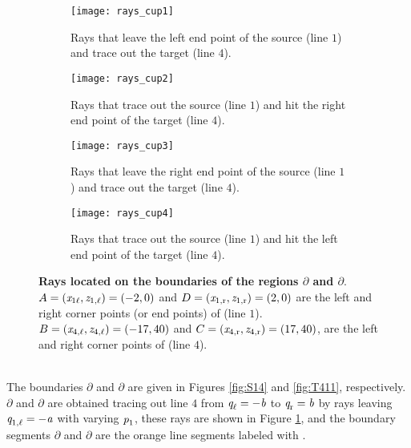 \begin{figure}
\centering
\begin{subfigure}{.48\textwidth}
  \centering
  \texttt{[image: rays\_cup1]}
  \caption{Rays that leave the left end point of the source (line $1$) and trace out the target (line $4$).}
  \label{fig:cup1}
\end{subfigure}%
\hfill
\begin{subfigure}{.48\textwidth}
  \centering
  \texttt{[image: rays\_cup2]}
  \caption{Rays that trace out the source (line $1$) and hit the right end point of the target (line $4$).}
  \label{fig:cup2}
\end{subfigure} %
\hfill
\begin{subfigure}{.48\textwidth}
  \centering
  \texttt{[image: rays\_cup3]}
  \caption{Rays that leave the right end point of the source (line $1$) and trace out the target (line $4$).}
  \label{fig:cup3}
\end{subfigure}%
\hfill
\begin{subfigure}{.48\textwidth}
  \centering
  \texttt{[image: rays\_cup4]}
  \caption{Rays that trace out the source (line $1$) and hit the left end point of the target (line $4$).}
  \label{fig:cup4}
\end{subfigure}
\caption{\textbf{Rays located on the boundaries of the regions $\partial$ and $\partial$}.
$A = (\textit{x}_{1 \ell}, \textit{z}_{1, \ell}) =(-2, 0)$ and 
$D = (\textit{x}_{1, \textrm{r}}, \textit{z}_{1, \textrm{r}}) = (2, 0)$ 
are the left and right corner points (or end points) of
 (line $1$).
$B =  (\textit{x}_{4, \ell}, \textit{z}_{4, \ell}) = (-17, 40)$ and $C =  (\textit{x}_{4, \textrm{r}}, \textit{z}_{4, \textrm{r}}) = (17 , 40)$, are the left and right corner points of  (line $4$).}
\label{fig:cups}
\end{figure} \\
 The boundaries $\partial$ and $\partial$ are given in Figures \ref{fig:S14} and \ref{fig:T411}, respectively.
$\partial$ and $\partial$ are obtained tracing out line $4$ from
$\textit{q}_{\ell} = -\textit{b}$ to $\textit{q}_{\textrm{r}} = \textit{b}$
 by rays leaving $\textit{q}_{1, \ell}= -\textit{a}$ with varying $\textit{p}_1$, these rays are shown in Figure \ref{fig:cup1}, and the boundary segments
 $\partial$ and $\partial$ are the orange line segments labeled with . 
